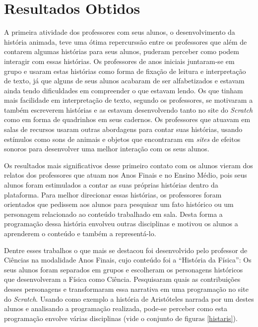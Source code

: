 \documentclass[12pt, openright, a4paper, brazil, english, french, spanish, bibjustif, openany, oneside]{abntex2}
\begin{document}
\section{Resultados Obtidos}

A primeira atividade dos professores com seus alunos, o desenvolvimento da história animada, teve uma ótima repercurssão entre os professores que além de contarem algumas histórias para seus alunos, puderam perceber como podem interagir com essas histórias. Os professores de anos iniciais juntaram-se em grupo e usaram estas histórias como forma de fixação de leitura e interpretação de texto, já que alguns de seus alunos acabaram de ser alfabetizados e estavam ainda tendo dificuldades em compreender o que estavam lendo. Os que tinham mais facilidade em interpretação de texto, segundo os professores, se motivaram a também escreverem histórias e as estavam desenvolvendo tanto no site do \textit{Scratch} como em forma de quadrinhos em seus cadernos. Os professores que atuavam em salas de recursos usaram outras abordagens para contar suas histórias, usando estímulos como sons de animais e objetos que encontraram em \textit{sites} de efeitos sonoros para desenvolver uma melhor interação com os seus alunos.

Os resultados mais significativos desse primeiro contato com os alunos vieram dos relatos dos professores que atuam nos Anos Finais e no Ensino Médio, pois seus alunos foram estimulados a contar as suas próprias histórias dentro da plataforma. Para melhor direcionar essas histórias, os professores foram orientados que pedissem aos alunos para pesquisar um fato histórico ou um personagem relacionado ao conteúdo trabalhado em sala. Desta forma a programação dessa história envolveu outras disciplinas e motivou os alunos a aprenderem o conteúdo e também a representá-lo. 

Dentre esses trabalhos o que mais se destacou foi desenvolvido pelo professor de Ciências na modalidade Anos Finais, cujo conteúdo foi a ``História da Física'': Os seus alunos foram separados em grupos e escolheram os personagens históricos que desenvolveram a Física como Ciência. Pesquisaram quais as contribuições desses personagens e transformaram essa narrativa em uma programação no site do \textit{Scratch}. Usando como exemplo a história de Aristóteles narrada por um destes alunos e analisando a programação realizada, pode-se perceber como esta programação envolve várias disciplinas (vide o conjunto de figuras \ref{histaris}).
\end{document}
